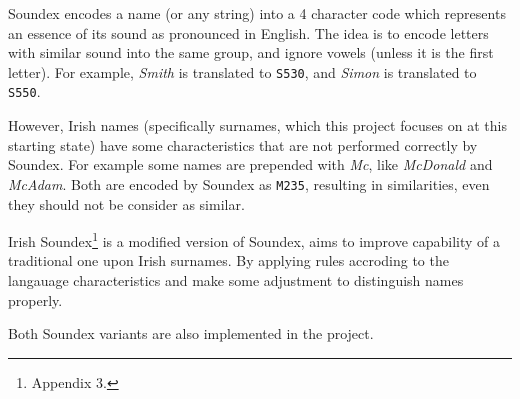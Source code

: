 Soundex \cite{soundex} encodes a name (or any string) into a 4 character code
which represents an essence of its sound as pronounced in English.
The idea is to encode letters with similar sound into the same group,
and ignore vowels (unless it is the first letter).
For example, \emph{Smith} is translated to \texttt{S530}, and
\emph{Simon} is translated to \texttt{S550}.





However, Irish names (specifically surnames, which this project
focuses on at this starting state) have some characteristics
that are not performed correctly by Soundex. For example
some names are prepended with \emph{Mc}, like \emph{McDonald} and
\emph{McAdam}. Both are encoded by Soundex as \texttt{M235},
resulting in similarities, even they should not be consider as similar.

Irish Soundex\footnote{\cite{adamw} Appendix 3.}
is a modified version of Soundex,
aims to improve capability of a traditional one upon Irish surnames.
By applying rules accroding to the langauage characteristics and
make some adjustment to distinguish names properly.

Both Soundex variants are also implemented in the project.


